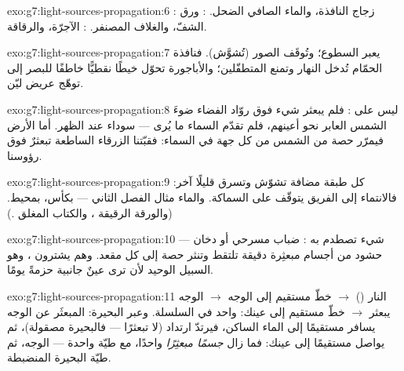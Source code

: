 \begin{solution}{exo:g7:light-sources-propagation:6}
: زجاج النافذة، والماء الصافي الضحل. : ورق
الشفّ، والغلاف المصنفر. : الآجرّة، والرقاقة.
\end{solution}

\begin{solution}{exo:g7:light-sources-propagation:7}
يعبر السطوع؛ وتُوقَف الصور (تُشوَّش). فنافذة الحمّام تُدخل 
النهار وتمنع المتطفّلين؛ والأباجورة تحوّل خيطًا نقطيًّا خاطفًا
للبصر إلى توهّج عريض ليّن.
\end{solution}

\begin{solution}{exo:g7:light-sources-propagation:8}
ليس على  : فلم يبعثر شيء فوق روّاد الفضاء ضوءَ الشمس
العابر نحو أعينهم، فلم تقدّم السماء ما يُرى --- سوداء عند
الظهر. أما  الأرض فيمرّر حصة من  الشمس من كل جهة في
السماء: فقبّتنا الزرقاء الساطعة تبعثرٌ فوق رؤوسنا.
\end{solution}

\begin{solution}{exo:g7:light-sources-propagation:9}
كل طبقة مضافة تشوّش وتسرق قليلًا آخر: فالانتماء إلى الفريق
يتوقّف على السماكة. والماء مثال الفصل الثاني ---  بكأس،
 بمحيط. (والورقة الرقيقة ، والكتاب المغلق
.)
\end{solution}

\begin{solution}{exo:g7:light-sources-propagation:10}
شيء تصطدم به : ضباب مسرحي أو دخان --- حشود من أجسام
مبعثِرة دقيقة تلتقط   وتنثر حصة إلى كل مقعد. وهم
يشترون ، وهو السبيل الوحيد لأن ترى عينٌ جانبية حزمةً
يومًا.
\end{solution}

\begin{solution}{exo:g7:light-sources-propagation:11}
النار () $\to$ خطّ مستقيم إلى الوجه $\to$ الوجه
يبعثر $\to$ خطّ مستقيم إلى عينك:  واحد في السلسلة.
وعبر البحيرة:  المبعثَر عن الوجه يسافر مستقيمًا إلى الماء
الساكن، فيرتدّ ارتداد  (لا تبعثرًا --- فالبحيرة مصقولة)،
ثم يواصل مستقيمًا إلى عينك: فما زال \emph{جسمًا مبعثِرًا}
واحدًا، مع طيّة  واحدة --- الوجه، ثم طيّة البحيرة
المنضبطة.
\end{solution}

